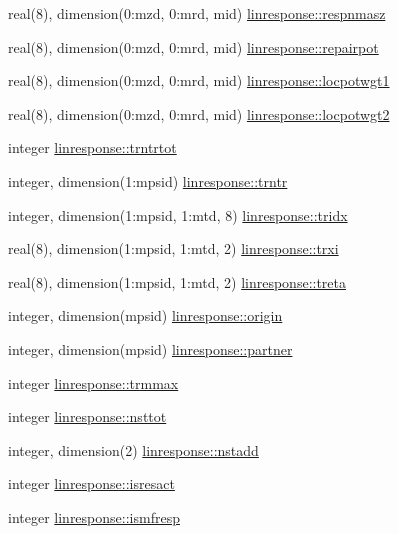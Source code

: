 \begin{DoxyCompactItemize}
\item 
real(8), dimension(0\+:mzd, 0\+:mrd, mid) \hyperlink{namespacelinresponse_a23f5c23741de87ff5cb9344b6a1da0a9}{linresponse\+::respnmasz}
\item 
real(8), dimension(0\+:mzd, 0\+:mrd, mid) \hyperlink{namespacelinresponse_a4512760ae7f7ad2161017e48b3ff033f}{linresponse\+::repairpot}
\item 
real(8), dimension(0\+:mzd, 0\+:mrd, mid) \hyperlink{namespacelinresponse_a028e7ac108ab51fd0fabac921cf71bca}{linresponse\+::locpotwgt1}
\item 
real(8), dimension(0\+:mzd, 0\+:mrd, mid) \hyperlink{namespacelinresponse_a819a78e71d0cf49dd813370193e4fb89}{linresponse\+::locpotwgt2}
\item 
integer \hyperlink{namespacelinresponse_adb61bfef079eb1930d139eed68f380b6}{linresponse\+::trntrtot}
\item 
integer, dimension(1\+:mpsid) \hyperlink{namespacelinresponse_add6adfb3307de506ff9df3fbced5d455}{linresponse\+::trntr}
\item 
integer, dimension(1\+:mpsid, 1\+:mtd, 8) \hyperlink{namespacelinresponse_a48946e006ee347a9d5cd199a7b0c9c9e}{linresponse\+::tridx}
\item 
real(8), dimension(1\+:mpsid, 1\+:mtd, 2) \hyperlink{namespacelinresponse_aa1829afaae570dd28780164ee7301ad3}{linresponse\+::trxi}
\item 
real(8), dimension(1\+:mpsid, 1\+:mtd, 2) \hyperlink{namespacelinresponse_a3fe3745d1132347ce166488d08c551ba}{linresponse\+::treta}
\item 
integer, dimension(mpsid) \hyperlink{namespacelinresponse_af98d69b735645ff6509e4f17f65e1c6c}{linresponse\+::origin}
\item 
integer, dimension(mpsid) \hyperlink{namespacelinresponse_aa082206ac85069a33ad130724ec7f1c5}{linresponse\+::partner}
\item 
integer \hyperlink{namespacelinresponse_a4b5cf5d78baf2df6fc432c2fd83cda23}{linresponse\+::trmmax}
\item 
integer \hyperlink{namespacelinresponse_a6f8d45bf8fde55dcec2af66995440168}{linresponse\+::nsttot}
\item 
integer, dimension(2) \hyperlink{namespacelinresponse_ae85d53e045bec02010f105cc0306ef0d}{linresponse\+::nstadd}
\item 
integer \hyperlink{namespacelinresponse_a67d3ff49b843c97654b915df16d434ff}{linresponse\+::isresact}
\item 
integer \hyperlink{namespacelinresponse_aad7355d12ba87d9de1019a98fc90774c}{linresponse\+::ismfresp}

\end{DoxyCompactItemize}
